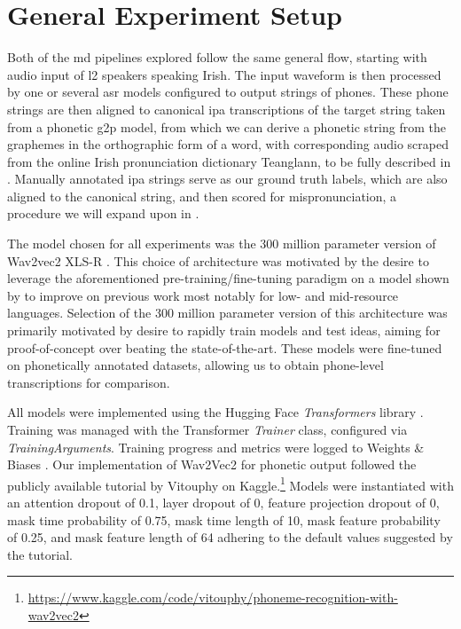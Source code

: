 \documentclass[thesis]{cluu}
\begin{document}
\section{General Experiment Setup}
Both of the \gls{md} pipelines explored follow the same general flow, starting with audio input of \gls{l2} speakers speaking Irish. The input waveform is then processed by one or several \gls{asr} models configured to output strings of phones. These phone strings are then aligned to canonical \gls{ipa} transcriptions of the target string taken from a phonetic \gls{g2p} model, from which we can derive a phonetic string from the graphemes in the orthographic form of a word, with corresponding audio scraped from the online Irish pronunciation dictionary Teanglann, to be fully described in . Manually annotated \gls{ipa} strings serve as our ground truth labels, which are also aligned to the canonical string, and then scored for mispronunciation, a procedure we will expand upon in .

The model chosen for all experiments was the 300 million parameter version of Wav2vec2 XLS-R \parencite{babuXLSRSelfsupervisedCrosslingual2021}. This choice of architecture was motivated by the desire to leverage the aforementioned pre-training/fine-tuning paradigm on a model shown by \textcite{babuXLSRSelfsupervisedCrosslingual2021} to improve on previous work most notably for low- and mid-resource languages. Selection of the 300 million parameter version of this architecture was primarily motivated by desire to rapidly train models and test ideas, aiming for proof-of-concept over beating the state-of-the-art. These models were fine-tuned on phonetically annotated datasets, allowing us to obtain phone-level transcriptions for comparison.

All models were implemented using the Hugging Face \textit{Transformers} library \parencite{wolfTransformersStateoftheArtNatural2020}. Training was managed with the Transformer \textit{Trainer} class, configured via \textit{TrainingArguments}. Training progress and metrics were logged to Weights \& Biases \parencite{biewaldExperimentTrackingWeights2020}. Our implementation of Wav2Vec2 for phonetic output followed the publicly available tutorial by Vitouphy on Kaggle.\footnote{\url{https://www.kaggle.com/code/vitouphy/phoneme-recognition-with-wav2vec2}} Models were instantiated with an attention dropout of 0.1, layer dropout of 0, feature projection dropout of 0, mask time probability of 0.75, mask time length of 10, mask feature probability of 0.25, and mask feature length of 64 adhering to the default values suggested by the tutorial.
\end{document}
